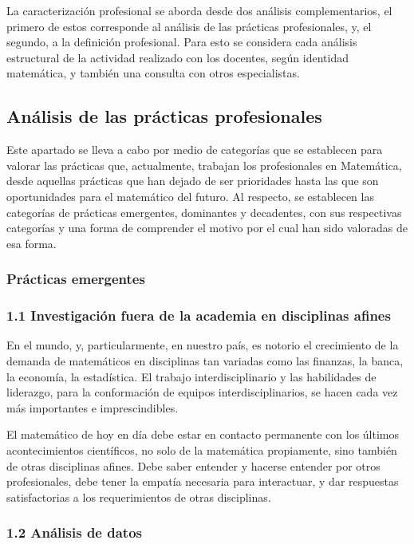 La caracterización profesional se aborda desde dos análisis complementarios, el primero de estos corresponde al análisis de las prácticas profesionales, y, el segundo, a la definición profesional. Para esto se considera cada análisis estructural de la actividad realizado con los docentes, según identidad matemática, y también una consulta con otros especialistas. 


\subsection{Análisis de las prácticas profesionales}


Este apartado se lleva a cabo por medio de categorías que se establecen para valorar las prácticas que, actualmente, trabajan los profesionales en Matemática, desde aquellas prácticas que han dejado de ser prioridades hasta las que son oportunidades para el matemático del futuro. Al respecto, se establecen las categorías de prácticas emergentes, dominantes y decadentes, con sus respectivas categorías y una forma de comprender el motivo por el cual han sido valoradas de esa forma.

\subsubsection{Prácticas emergentes}

\subsubsection*{ 1.1 Investigación fuera de la academia en disciplinas afines}


En el mundo, y, particularmente, en nuestro país, es notorio el crecimiento de la demanda de matemáticos en disciplinas tan variadas como las finanzas, la banca, la economía, la estadística. El trabajo interdisciplinario y las habilidades de liderazgo, para la conformación de equipos interdisciplinarios, se hacen cada vez más importantes e imprescindibles. 

El matemático de hoy en día debe estar en contacto permanente con los últimos acontecimientos científicos, no solo de la matemática propiamente, sino también de otras disciplinas afines. Debe saber entender y hacerse entender por otros profesionales, debe tener la empatía necesaria para interactuar, y dar respuestas satisfactorias a los requerimientos de otras disciplinas.

\subsubsection*{ 1.2 Análisis de datos}

